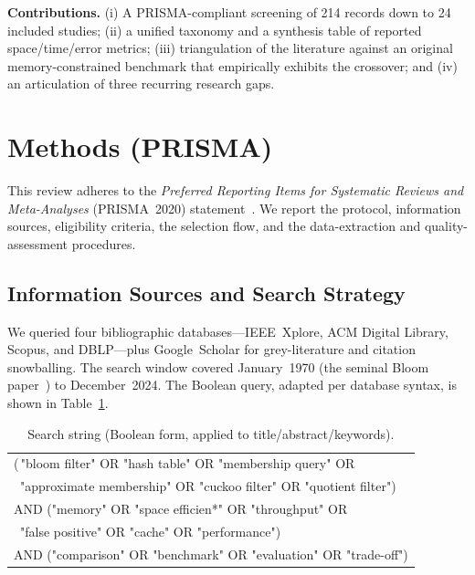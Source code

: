 \documentclass[conference]{IEEEtran}
\begin{document}
\noindent\textbf{Contributions.} (i) A PRISMA-compliant screening of 214
records down to 24 included studies; (ii) a unified taxonomy and a synthesis
table of reported space/time/error metrics; (iii) triangulation of the
literature against an original memory-constrained benchmark that empirically
exhibits the crossover; and (iv) an articulation of three recurring research
gaps.

\section{Methods (PRISMA)}
This review adheres to the \emph{Preferred Reporting Items for Systematic
Reviews and Meta-Analyses} (PRISMA~2020) statement~\cite{page2021prisma}. We
report the protocol, information sources, eligibility criteria, the selection
flow, and the data-extraction and quality-assessment procedures.

\subsection{Information Sources and Search Strategy}
We queried four bibliographic databases---IEEE~Xplore, ACM Digital Library,
Scopus, and DBLP---plus Google~Scholar for grey-literature and citation
snowballing. The search window covered January~1970 (the seminal Bloom
paper~\cite{bloom1970}) to December~2024. The Boolean query, adapted per
database syntax, is shown in Table~\ref{tab:search}.

\begin{table}[!t]
\caption{Search string (Boolean form, applied to title/abstract/keywords).}
\label{tab:search}
\centering
\renewcommand{\arraystretch}{1.2}
\begin{tabular}{@{}p{}@{}}
\toprule
\ttfamily\scriptsize
(\,"bloom filter" OR "hash table" OR "membership query" OR\\
\ttfamily\scriptsize
\ "approximate membership" OR "cuckoo filter" OR "quotient filter")\\
\ttfamily\scriptsize
AND ("memory" OR "space efficien*" OR "throughput" OR\\
\ttfamily\scriptsize
\ "false positive" OR "cache" OR "performance")\\
\ttfamily\scriptsize
AND ("comparison" OR "benchmark" OR "evaluation" OR "trade-off")\\
\bottomrule
\end{tabular}
\end{table}
\end{document}
